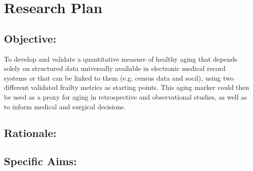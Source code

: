 \section{Research Plan }\label{research-plan}


\subsection{Objective:}\label{objective}
  
To develop and validate a quantitative measure of healthy aging that depends solely on structured data universally available in electronic medical record systems or that can be linked to them (e.g. census data and socil),
using two different validated frailty metrics as starting points. This
aging marker could then be used as a proxy for aging in retrospective
and observational studies, as well as to inform medical and surgical
decisions.


\subsection{Rationale:}\label{rationale}

\subsection{Specific Aims:}\label{specific-aims}
